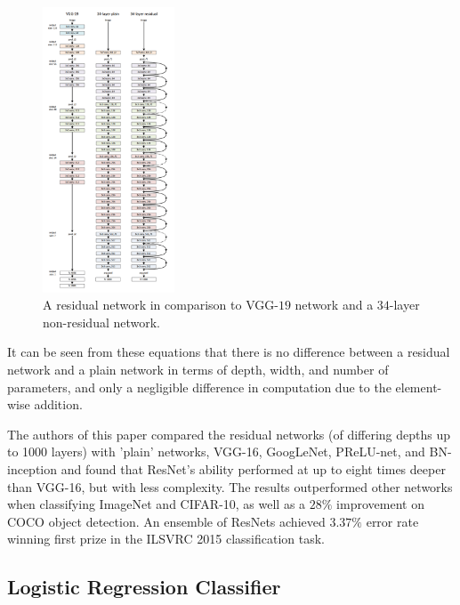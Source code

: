 \documentclass[fleqn,twoside,12pt]{report}
\begin{document}
\begin{figure}
	\begin{center}
		\includegraphics[width=0.35\textwidth]{resnet_full.png}
	\end{center}
	\caption{A residual network in comparison to VGG-$19$ network and a $34$-layer non-residual network.}
	\label{fig:resnet_full}
\end{figure} 




It can be seen from these equations that there is no difference between a residual network and a plain network in terms of depth, width, and number of parameters, and only a negligible difference in computation due to the element-wise addition.

The authors of this paper compared the residual networks (of differing depths up to 1000 layers) with 'plain' networks, VGG-16, GoogLeNet, PReLU-net, and BN-inception and found that ResNet's ability performed at up to eight times deeper than VGG-16, but with less complexity. The results outperformed other networks when classifying ImageNet and CIFAR-10, as well as a $28\%$ improvement on COCO object detection. An ensemble of ResNets achieved $3.37\%$ error rate winning first prize in the ILSVRC 2015 classification task.


\subsection{Logistic Regression Classifier}
\end{document}
